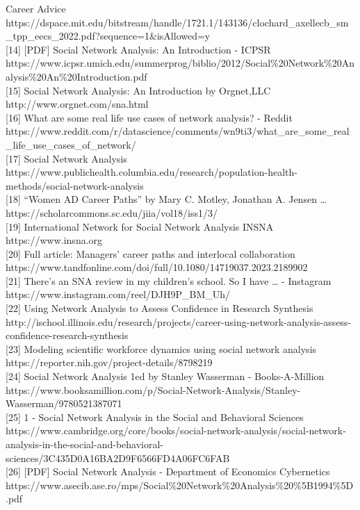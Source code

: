 \documentclass[
  letterpaper,
  DIV=11,
  numbers=noendperiod]{scrartcl}
\begin{document}
Career Advice
https://dspace.mit.edu/bitstream/handle/1721.1/143136/clochard\_axellecb\_sm\_tpp\_eecs\_2022.pdf?sequence=1\&isAllowed=y\\
{[}14{]} {[}PDF{]} Social Network Analysis: An Introduction - ICPSR
https://www.icpsr.umich.edu/summerprog/biblio/2012/Social\%20Network\%20Analysis\%20An\%20Introduction.pdf\\
{[}15{]} Social Network Analysis: An Introduction by Orgnet,LLC
http://www.orgnet.com/sna.html\\
{[}16{]} What are some real life use cases of network analysis? - Reddit
https://www.reddit.com/r/datascience/comments/wn9ti3/what\_are\_some\_real\_life\_use\_cases\_of\_network/\\
{[}17{]} Social Network Analysis
https://www.publichealth.columbia.edu/research/population-health-methods/social-network-analysis\\
{[}18{]} ``Women AD Career Paths'' by Mary C. Motley, Jonathan A. Jensen
\ldots{} https://scholarcommons.sc.edu/jiia/vol18/iss1/3/\\
{[}19{]} International Network for Social Network Analysis \textbar{}
INSNA https://www.insna.org\\
{[}20{]} Full article: Managers' career paths and interlocal
collaboration
https://www.tandfonline.com/doi/full/10.1080/14719037.2023.2189902\\
{[}21{]} There's an SNA review in my children's school. So I have
\ldots{} - Instagram https://www.instagram.com/reel/DJH9P\_BM\_Uh/\\
{[}22{]} Using Network Analysis to Assess Confidence in Research
Synthesis
http://ischool.illinois.edu/research/projects/career-using-network-analysis-assess-confidence-research-synthesis\\
{[}23{]} Modeling scientific workforce dynamics using social network
analysis https://reporter.nih.gov/project-details/8798219\\
{[}24{]} Social Network Analysis 1ed by Stanley Wasserman -
Books-A-Million
https://www.booksamillion.com/p/Social-Network-Analysis/Stanley-Wasserman/9780521387071\\
{[}25{]} 1 - Social Network Analysis in the Social and Behavioral
Sciences
https://www.cambridge.org/core/books/social-network-analysis/social-network-analysis-in-the-social-and-behavioral-sciences/3C435D0A16BA2D9F6566FD4A06FC6FAB\\
{[}26{]} {[}PDF{]} Social Network Analysis - Department of Economics
Cybernetics
https://www.asecib.ase.ro/mps/Social\%20Network\%20Analysis\%20\%5B1994\%5D.pdf\\
\end{document}
